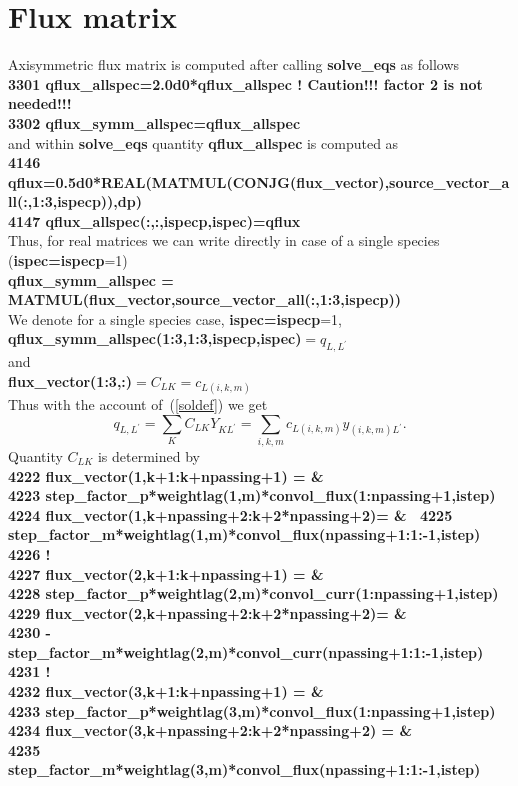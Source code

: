 \documentclass[preprint,prb,aps]{revtex4-1}
\newcommand{\be}[1]{\begin{equation} \label{#1}}
\newcommand{\ee}{\end{equation}}
\newcommand{\eq}[1]{(\ref{#1})}
\begin{document}
\section{Flux matrix}
Axisymmetric flux matrix is computed after calling {\bf solve\_eqs} as follows
\\
{\bf
3301        qflux\_allspec=2.0d0*qflux\_allspec ! Caution!!! factor 2 is not needed!!! \\
3302        qflux\_symm\_allspec=qflux\_allspec
}
\\
and within {\bf solve\_eqs} quantity {\bf qflux\_allspec} is computed as
\\
{\bf
4146       qflux=0.5d0*REAL(MATMUL(CONJG(flux\_vector),source\_vector\_all(:,1:3,ispecp)),dp) \\
4147       qflux\_allspec(:,:,ispecp,ispec)=qflux
}
\\
Thus, for real matrices we can write directly in case of a single species ({\bf ispec=ispecp}=1)
\\
{\bf
qflux\_symm\_allspec = MATMUL(flux\_vector,source\_vector\_all(:,1:3,ispecp))
}
\\
We denote for a single species case, {\bf ispec=ispecp}=1,
\\
{\bf qflux\_symm\_allspec(1:3,1:3,ispecp,ispec)}$=q_{L,L^\prime}$
\\
and
\\
{\bf flux\_vector(1:3,:)}$=C_{LK}=c_{L(i,k,m)}$
\\
Thus with the account of~\eq{soldef} we get
\be{gendef_qflux}
q_{L,L^\prime} = \sum_K C_{LK} Y_{KL^\prime}=\sum_{i,k,m} c_{L(i,k,m)} y_{(i,k,m)L^\prime}.
\ee
Quantity $C_{LK}$ is determined by
\\
{\bf
4222         flux\_vector(1,k+1:k+npassing+1) =                                     \& \\
4223               step\_factor\_p*weightlag(1,m)*convol\_flux(1:npassing+1,istep) \\
4224         flux\_vector(1,k+npassing+2:k+2*npassing+2)=                           \& \
4225               step\_factor\_m*weightlag(1,m)*convol\_flux(npassing+1:1:-1,istep) \\
4226 ! \\
4227         flux\_vector(2,k+1:k+npassing+1) =                                     \& \\
4228               step\_factor\_p*weightlag(2,m)*convol\_curr(1:npassing+1,istep) \\
4229         flux\_vector(2,k+npassing+2:k+2*npassing+2)=                           \& \\
4230              -step\_factor\_m*weightlag(2,m)*convol\_curr(npassing+1:1:-1,istep) \\
4231 ! \\
4232         flux\_vector(3,k+1:k+npassing+1) =                                     \& \\
4233               step\_factor\_p*weightlag(3,m)*convol\_flux(1:npassing+1,istep) \\
4234         flux\_vector(3,k+npassing+2:k+2*npassing+2) =                          \& \\
4235               step\_factor\_m*weightlag(3,m)*convol\_flux(npassing+1:1:-1,istep) \\
}
\end{document}
